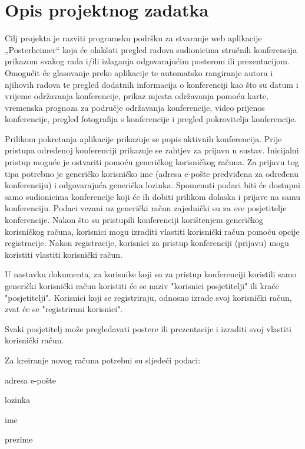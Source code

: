 \chapter{Opis projektnog zadatka}
		
		Cilj projekta je razviti programsku podršku za stvaranje web aplikacije „Posterheimer“ koja će olakšati pregled radova sudionicima stručnih konferencija prikazom svakog rada i/ili izlaganja odgovarajućim posterom ili prezentacijom. Omogućit će glasovanje preko aplikacije te automatsko rangiranje autora i njihovih radova te pregled dodatnih informacija o konferenciji kao što su datum i vrijeme održavanja konferencije, prikaz mjesta održavanja pomoću karte, vremenska prognoza za područje održavanja konferencije, video prijenos konferencije, pregled fotografija s konferencije i pregled pokrovitelja konferencije.
		
		Prilikom pokretanja aplikacije prikazuje se popis aktivnih konferencija. Prije pristupa određenoj konferenciji prikazuje se zahtjev za prijavu u sustav. Inicijalni pristup moguće je ostvariti pomoću generičkog korisničkog računa. Za prijavu tog tipa potrebno je generičko korisničko ime (adresa e-pošte predviđena za određenu konferenciju) i odgovarajuća generička lozinka. Spomenuti podaci biti će dostupni samo sudionicima konferencije koji će ih dobiti prilikom dolaska i prijave na samu konferenciju. Podaci vezani uz generički račun zajednički su za sve posjetitelje konferencije. Nakon što su pristupili konferenciji korištenjem generičkog korisničkog računa, korisnici mogu izraditi vlastiti korisnički račun pomoću opcije registracije. Nakon registracije, korisnici za pristup konferenciji (prijavu) mogu koristiti vlastiti korisnički račun. 

		U nastavku dokumenta, za korisnike koji su za pristup konferenciji koristili samo generički korisnički račun koristiti će se naziv "korisnici posjetitelji" ili kraće "posjetitelji". Korisnici koji se registriraju, odnosno izrade svoj korisnički račun, zvat će se "registrirani korisnici". 
		
		Svaki posjetitelj može pregledavati postere ili prezentacije i izraditi svoj vlastiti korisnički račun.
		
		Za kreiranje novog računa potrebni su sljedeći podaci:
		\begin{packed_item}
			\item adresa e-pošte
			\item lozinka
			\item ime
			\item prezime
		\end{packed_item}
		
